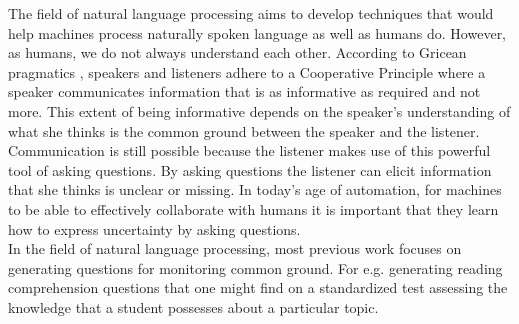 \documentclass[11pt]{report}
\numberwithin{equation}{section}
\begin{document}

\noindent
The field of natural language processing aims to develop techniques that would help machines process naturally spoken language as well as humans do. However, as  humans, we do not always understand each other. According to Gricean pragmatics \cite{grice1975logic}, speakers and listeners adhere to a Cooperative Principle where a speaker communicates information that is as informative as required and not more. This extent of being informative depends on the speaker's understanding of what she thinks is the common ground between the speaker and the listener. Communication is still possible because the listener makes use of this powerful tool of asking questions. By asking questions the listener can elicit information that she thinks is unclear or missing. In today's age of automation, for machines to be able to effectively collaborate with humans it is important that they learn how to express uncertainty by asking questions.\\

\noindent
In the field of natural language processing, most previous work focuses on generating questions for monitoring common ground. For e.g. generating reading comprehension questions that one might find on a standardized test assessing the knowledge that a student possesses about a particular topic.\\


\end{document}
